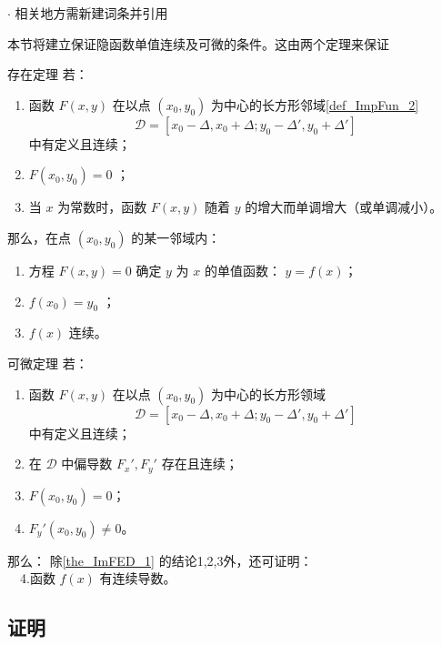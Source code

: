 
\begin{issues}
$\cdot$ 相关地方需新建词条并引用
\end{issues}

本节将建立保证隐函数单值连续及可微的条件。这由两个定理来保证
\begin{theorem}{存在定理}\label{the_ImFED_1}
若：\begin{enumerate}
\item 函数 $F(x,y)$ 在以点 $(x_0,y_0)$ 为中心的长方形邻域\autoref{def_ImpFun_2}~
\begin{equation}
\mathcal{D}=[x_0-\Delta,x_0+\Delta;y_0-\Delta',y_0+\Delta']~
\end{equation}
中有定义且连续；
\item $F(x_0,y_0)=0$ ；
\item 当 $x$ 为常数时，函数 $F(x,y)$ 随着 $y$ 的增大而单调增大（或单调减小）。
\end{enumerate}
那么，在点 $(x_0,y_0)$ 的某一邻域内：
\begin{enumerate}
\item 方程 $F(x,y)=0$ 确定 $y$ 为 $x$ 的单值函数： $y=f(x)$；
\item $f(x_0)=y_0$ ；
\item $f(x)$ 连续。
\end{enumerate}
\end{theorem}

\begin{theorem}{可微定理}
若：
\begin{enumerate}
\item 函数 $F(x,y)$ 在以点 $(x_0,y_0)$ 为中心的长方形领域
\begin{equation}
\mathcal{D}=[x_0-\Delta,x_0+\Delta;y_0-\Delta',y_0+\Delta']~
\end{equation}
中有定义且连续；
\item 在 $\mathcal{D}$ 中偏导数 $F_x',F_y'$ 存在且连续；
\item $F(x_0,y_0)=0$；
\item $F_y'(x_0,y_0)\neq0$。
\end{enumerate}
那么：
除\autoref{the_ImFED_1} 的结论1,2,3外，还可证明：\\
$\quad$4.函数 $f(x)$ 有连续导数。

\end{theorem}
\subsection{证明}
